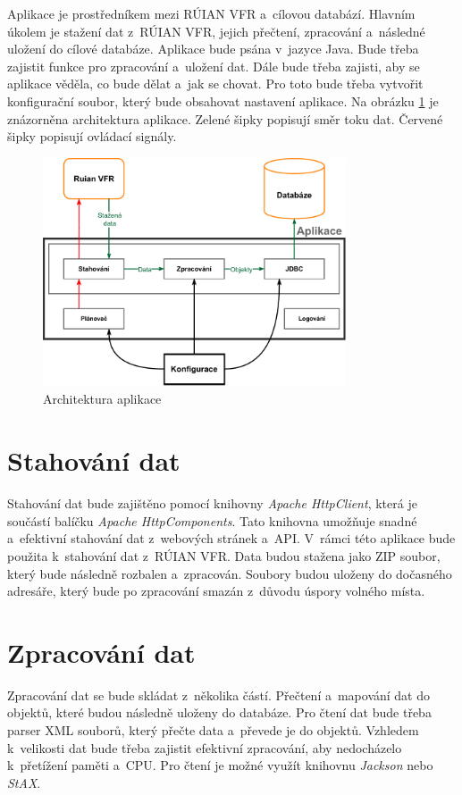Aplikace je prostředníkem mezi RÚIAN VFR a~cílovou databází.
Hlavním úkolem je stažení dat z~RÚIAN VFR, jejich přečtení, zpracování a~následné uložení do cílové databáze.
Aplikace bude psána v~jazyce Java. Bude třeba zajistit funkce pro zpracování a~uložení dat.
Dále bude třeba zajisti, aby se aplikace věděla, co bude dělat a~jak se chovat.
Pro toto bude třeba vytvořit konfigurační soubor, který bude obsahovat nastavení aplikace.
Na obrázku \ref{fig:architektura} je znázorněna architektura aplikace.
Zelené šipky popisují směr toku dat.
Červené šipky popisují ovládací signály.

\begin{figure}[!h]
    \centering
    \includegraphics[width=0.8\textwidth]{figures/Aplikace_Scheme.pdf}
    \caption{Architektura aplikace}
    \label{fig:architektura}
\end{figure}

\newpage

\section{Stahování dat}
Stahování dat bude zajištěno pomocí knihovny \textit{Apache HttpClient}, která je 
součástí balíčku \textit{Apache HttpComponents}. 
Tato knihovna umožňuje snadné a~efektivní stahování dat z~webových stránek a~API. 
V~rámci této aplikace bude použita k~stahování dat z~RÚIAN VFR.
Data budou stažena jako ZIP soubor, který bude následně rozbalen a~zpracován.
Soubory budou uloženy do dočasného adresáře, který bude po zpracování smazán z~důvodu úspory volného místa.

\section{Zpracování dat}
Zpracování dat se bude skládat z~několika částí.
Přečtení a~mapování dat do objektů, které budou následně uloženy do databáze.
Pro čtení dat bude třeba parser XML souborů, který přečte data a~převede je do objektů.
Vzhledem k~velikosti dat bude třeba zajistit efektivní zpracování, aby nedocházelo 
k~přetížení paměti a~CPU.
Pro čtení je možné využít knihovnu \textit{Jackson} nebo \textit{StAX}.

